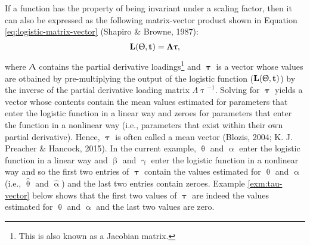 \documentclass[
12pt, %
twoside,
english]{guelphthesis}
\theoremstyle{definition}
\theoremstyle{definition}
\theoremstyle{definition}
\theoremstyle{definition}
\theoremstyle{remark}
\begin{document}
\noindent If a function has the property of being invariant under a
scaling factor, then it can also be expressed as the following
matrix-vector product shown in Equation \ref{eq:logistic-matrix-vector}
(Shapiro \& Browne, 1987):
\begin{align}
 \mathbf{L(\Uptheta, t)} = \mathbf{\Lambda\uptau},
\label{eq:logistic-matrix-vector}
\end{align}
\noindent where \(\mathbf{\Uplambda}\) contains the partial derivative loadings\footnote{This is also known as a Jacobian matrix.} and
\(\mathbf{\uptau}\) is a vector whose values are otbained by pre-multiplying the output of the logistic function (\(\mathbf{L(\Uptheta, t)}\)) by the inverse of the partial derivative loading matrix \({\Lambda\uptau}^{-1}\). Solving for \(\mathbf{\uptau}\) yields a vector whose contents contain the mean values estimated for parameters that enter the logistic function in a linear way and
zeroes for parameters that enter the function in a nonlinear way (i.e.,
parameters that exist within their own partial derivative). Hence, \(\mathbf{\uptau}\) is often called a mean vector (Blozis, 2004; K. J. Preacher \& Hancock, 2015). In the current example, \(\uptheta\) and \(\upalpha\) enter the logistic function
in a linear way and \(\upbeta\) and \(\upgamma\) enter the logistic function
in a nonlinear way and so the first two entries of \(\mathbf{\uptau}\)
contain the values estimated for \(\uptheta\) and \(\upalpha\) (i.e.,
\(\hat{\uptheta}\) and \(\hat{\upalpha}\)) and the last two entries contain zeroes. Example \ref{exm:tau-vector} below shows that the first two
values of \(\mathbf{\uptau}\) are indeed the values estimated for
\(\uptheta\) and \(\upalpha\) and the last two values are zero.
\end{document}
